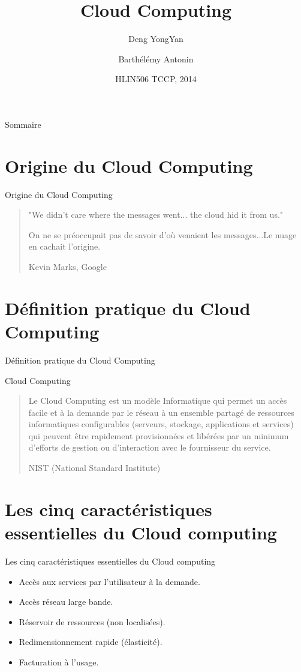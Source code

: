 \documentclass{beamer}
\title{Cloud Computing}
\author{Deng YongYan\and Barthélémy Antonin}
\institute[UM2]
{
    Université Montpellier 2
}
\date{HLIN506 TCCP, 2014}
\begin{document}
\begin{frame}
  \titlepage
\end{frame}

\begin{frame}{Sommaire}
  \tableofcontents
\end{frame}


\section{Origine du Cloud Computing}

\begin{frame}{Origine du Cloud Computing}
\begin{quotation}
"We didn’t care where the messages went... the cloud hid it from us."

On ne se préoccupait pas de savoir d’où venaient les messages...Le nuage en cachait l’origine.

\hfill{Kevin Marks, Google}
\end{quotation}


\end{frame}

\section{Définition pratique du Cloud Computing}


\begin{frame}{Définition pratique du Cloud Computing}
\begin{block}{Cloud Computing}
\begin{quotation}
Le Cloud Computing est un modèle Informatique qui permet un accès facile et à la demande par le réseau à un ensemble partagé de ressources informatiques configurables (serveurs, stockage, applications et services) qui peuvent être rapidement provisionnées et libérées par  un minimum d’efforts de gestion ou d’interaction avec le fournisseur du service.

\hfill{NIST (National Standard Institute)}
\end{quotation}
\end{block}
\end{frame}

\section{Les cinq caractéristiques essentielles du Cloud computing}

\begin{frame}{Les cinq caractéristiques essentielles du Cloud computing}
  \begin{itemize}
  \item {
    Accès aux services par l'utilisateur à la demande.
    \pause 
  }
  \item {   
    Accès réseau large bande.
  }
  \item<3-> {
    Réservoir de ressources (non localisées).
  }
  \item<4-> {
    Redimensionnement rapide (élasticité).
  }
  \item<5-> {
    Facturation à l'usage.
  }
  \end{itemize}
\end{frame}
\end{document}
